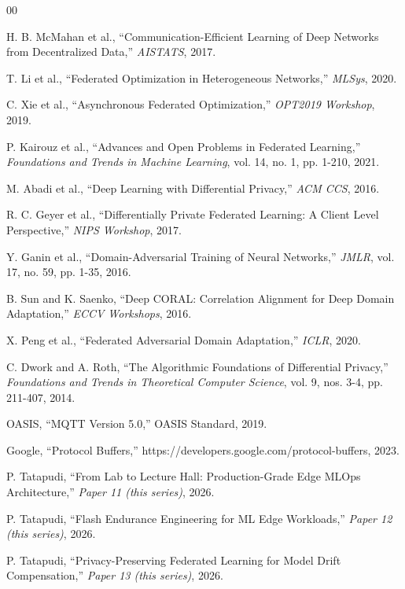 \documentclass[conference]{IEEEtran}
\begin{document}
\begin{thebibliography}{00}

 H. B. McMahan et al., ``Communication-Efficient Learning of Deep Networks from Decentralized Data,'' \textit{AISTATS}, 2017.

 T. Li et al., ``Federated Optimization in Heterogeneous Networks,'' \textit{MLSys}, 2020.

 C. Xie et al., ``Asynchronous Federated Optimization,'' \textit{OPT2019 Workshop}, 2019.

 P. Kairouz et al., ``Advances and Open Problems in Federated Learning,'' \textit{Foundations and Trends in Machine Learning}, vol. 14, no. 1, pp. 1-210, 2021.

 M. Abadi et al., ``Deep Learning with Differential Privacy,'' \textit{ACM CCS}, 2016.

 R. C. Geyer et al., ``Differentially Private Federated Learning: A Client Level Perspective,'' \textit{NIPS Workshop}, 2017.

 Y. Ganin et al., ``Domain-Adversarial Training of Neural Networks,'' \textit{JMLR}, vol. 17, no. 59, pp. 1-35, 2016.

 B. Sun and K. Saenko, ``Deep CORAL: Correlation Alignment for Deep Domain Adaptation,'' \textit{ECCV Workshops}, 2016.

 X. Peng et al., ``Federated Adversarial Domain Adaptation,'' \textit{ICLR}, 2020.

 C. Dwork and A. Roth, ``The Algorithmic Foundations of Differential Privacy,'' \textit{Foundations and Trends in Theoretical Computer Science}, vol. 9, nos. 3-4, pp. 211-407, 2014.

 OASIS, ``MQTT Version 5.0,'' OASIS Standard, 2019.

 Google, ``Protocol Buffers,'' https://developers.google.com/protocol-buffers, 2023.

 P. Tatapudi, ``From Lab to Lecture Hall: Production-Grade Edge MLOps Architecture,'' \textit{Paper 11 (this series)}, 2026.

 P. Tatapudi, ``Flash Endurance Engineering for ML Edge Workloads,'' \textit{Paper 12 (this series)}, 2026.

 P. Tatapudi, ``Privacy-Preserving Federated Learning for Model Drift Compensation,'' \textit{Paper 13 (this series)}, 2026.

\end{thebibliography}
\end{document}
